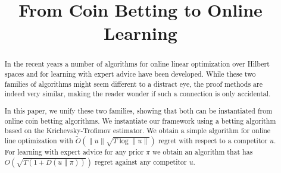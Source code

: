 \documentclass{colt2016} %
\title{From Coin Betting to Online Learning}
\newcommand{\KL}[2]{D({#1}\|{#2})}  %
\begin{document}
\maketitle

\begin{abstract}
In the recent years a number of algorithms for online linear optimization over
Hilbert spaces and for learning with expert advice have been developed. While
these two families of algorithms might seem different to a distract eye, the
proof methods are indeed very similar, making the reader wonder if such a
connection is only accidental.

In this paper, we unify these two families, showing that both can be
instantiated from online coin betting algorithms. We instantiate our framework
using a betting algorithm based on the Krichevsky-Trofimov estimator. We obtain
a simple algorithm for online line optimization with $\widetilde O(\|u\|\sqrt{T
\log\|u\|})$ regret with respect to a competitor $u$. For learning with
expert advice for any prior $\pi$ we obtain an algorithm that has $O(\sqrt{T
(1 + \KL{u}{\pi})})$ regret against any competitor $u$.
\end{abstract}










\appendix
\end{document}

